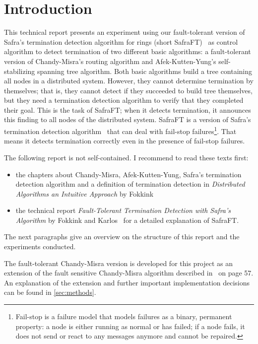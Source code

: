 \section{Introduction}
This technical report presents an experiment using our fault-tolerant version of Safra's termination detection algorithm for rings (short SafraFT)~\cite{safraFT2018}
as control algorithm to detect termination of two different basic algorithms: a fault-tolerant version of Chandy-Misra's routing algorithm and Afek-Kutten-Yung's self-stabilizing spanning tree algorithm.
Both basic algorithms build a tree containing all nodes in a distributed system.
However, they cannot determine termination by themselves; that is, they cannot detect if they succeeded to build tree themselves, but they need a termination detection algorithm to verify that they completed their goal.
This is the task of SafraFT; when it detects termination, it announces this finding to all nodes of the distributed system.
SafraFT is a version of Safra's termination detection algorithm~\cite{safraFS} that can deal with fail-stop failures\footnote{Fail-stop is a failure model that models failures as a binary, permanent property: a node is either running as normal or has failed; if a node fails, it does not send or react to any messages anymore and cannot be repaired.}. 
That means it detects termination correctly even in the presence of fail-stop failures.

The following report is not self-contained.
I recommend to read these texts first:
\begin{itemize}
	\item the chapters about Chandy-Misra, Afek-Kutten-Yung, Safra's termination detection algorithm and a definition of termination detection in \textit{Distributed Algorithms an Intuitive Approach} by Fokkink~\cite{fokkink:2018}
	\item the technical report \textit{Fault-Tolerant Termination Detection with Safra’s Algorithm} by Fokkink and Karlos~\cite{safraFT2018} for a detailed explanation of SafraFT.
\end{itemize}
The next paragraphs give an overview on the structure of this report and the experiments conducted.

The fault-tolerant Chandy-Misra version is developed for this project as an extension of the fault sensitive Chandy-Misra algorithm described in~\cite{fokkink:2018} on page 57.
An explanation of the extension and further important implementation decisions can be found in \cref{sec:methods}.


